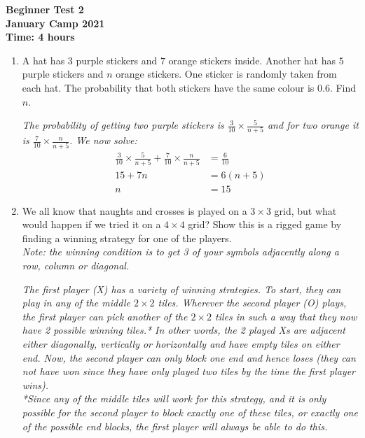 \documentclass{article}
\begin{document}
\thispagestyle{empty}

\begin{center}
  \textbf{\Large Beginner Test 2}
  \\ \vspace{1em}
  \textbf{\large January Camp 2021}
  \\ \vspace{1em}
  \textbf{\large Time: 4 hours}
\end{center}

\vspace{24pt}

\begin{enumerate}[1.]


\item %
A hat has $3$ purple stickers and $7$ orange stickers inside. Another hat has $5$ purple stickers and $n$ orange stickers. One sticker is randomly taken from each hat. The probability that both stickers have the same colour is $0.6$. Find $n$.

{\itshape The probability of getting two purple stickers is $\frac{3}{10}\times\frac{5}{n+5}$ and for two orange it is $\frac{7}{10}\times\frac{n}{n+5}$. We now solve:
\begin{align*}
\frac{3}{10}\times\frac{5}{n+5}+\frac{7}{10}\times\frac{n}{n+5}&=\frac{6}{10}\\
15+7n&=6(n+5)\\
n&=15
\end{align*}}

\item %
We all know that naughts and crosses is played on a $3\times 3$ grid, but what would happen if we tried it on a $4\times 4$ grid? Show this is a rigged game by finding a winning strategy for one of the players.\\
\textit{Note: the winning condition is to get 3 of your symbols adjacently along a row, column or diagonal.}

{\itshape The first player (X) has a variety of winning strategies. To start, they can play in any of the middle $2\times 2$ tiles. Wherever the second player (O) plays, the first player can pick another of the $2\times 2$ tiles in such a way that they now have 2 possible winning tiles.* In other words, the 2 played Xs are adjacent either diagonally, vertically or horizontally and have empty tiles on either end. Now, the second player can only block one end and hence loses (they can not have won since they have only played two tiles by the time the first player wins).\\
*Since any of the middle tiles will work for this strategy, and it is only possible for the second player to block exactly one of these tiles, or exactly one of the possible end blocks, the first player will always be able to do this.}


\end{enumerate}
\end{document}

